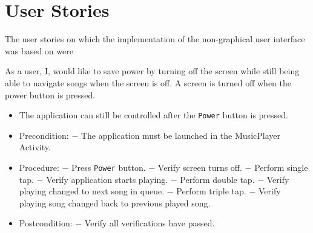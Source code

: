 \section{User Stories}
The user stories on which the implementation of the non-graphical user interface was based on were

{As a user, I, would like to save power by turning off the screen while still being able to navigate songs when the screen is off.
A screen is turned off when the power button is pressed.}
{\begin{itemize}
\item The application can still be controlled after the \texttt{Power} button is pressed.
\end{itemize}}
{\begin{itemize}
\item Precondition: 
\subitem $-$ The application must be launched in the MusicPlayer Activity.

\item Procedure:
\subitem $-$ Press \texttt{Power} button.
\subitem $-$ Verify screen turns off.
\subitem $-$ Perform single tap.
\subitem $-$ Verify application starts playing.
\subitem $-$ Perform double tap.
\subitem $-$ Verify playing changed to next song in queue.
\subitem $-$ Perform triple tap.
\subitem $-$ Verify playing song changed back to previous played song.

\item Postcondition:
\subitem $-$ Verify all verifications have passed.
\end{itemize}}